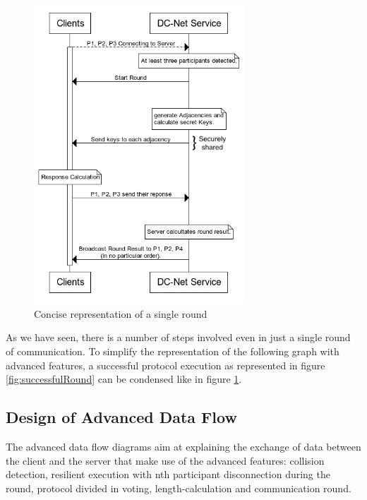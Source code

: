\begin{figure}[H]
    \centering
    \includegraphics[width=0.7\textwidth]{Images/Design/singleRoundCondensed.png}
    \caption{Concise representation of a single round }
    \label{fig:singleRoundCondensed}
\end{figure}

As we have seen, there is a number of steps involved even in just a single round of communication. To simplify the representation of the following graph with advanced features, a successful protocol execution as represented in figure \ref{fig:successfulRound} can be condensed like in figure \ref{fig:singleRoundCondensed}.



\subsection{Design of Advanced Data Flow}
The advanced data flow diagrams aim at explaining the exchange of data between the client and the server that make use of the advanced features: collision detection, resilient execution with nth participant disconnection during the round, protocol divided in voting, length-calculation and communication round.

